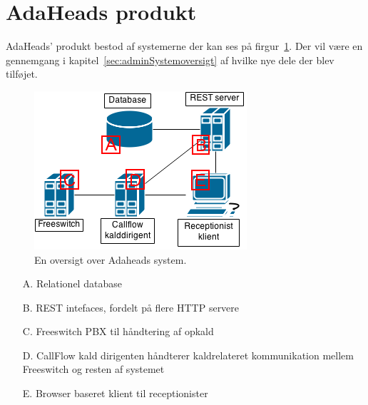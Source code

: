 \section{AdaHeads produkt}
AdaHeads' produkt bestod af systemerne der kan ses på firgur~\ref{fig:adaheadssystembefore}. Der vil være en gennemgang i kapitel~\ref{sec:adminSystemoversigt} af hvilke nye dele der blev tilføjet.
\begin{figure}[ht!]
\centering
\includegraphics[scale=0.5]{images/system_before_admin.png}
\caption{En oversigt over Adaheads system.}
\label{fig:adaheadssystembefore}
\end{figure}
\begin{enumerate}
	\item[A.]{Relationel database}
	\item[B.]{REST intefaces, fordelt på flere HTTP servere}
	\item[C.]{Freeswitch PBX til håndtering af opkald} 
	\item[D.]{CallFlow kald dirigenten håndterer kaldrelateret kommunikation mellem Freeswitch og resten af systemet}
	\item[E.]{Browser baseret klient til receptionister}
\end{enumerate}
